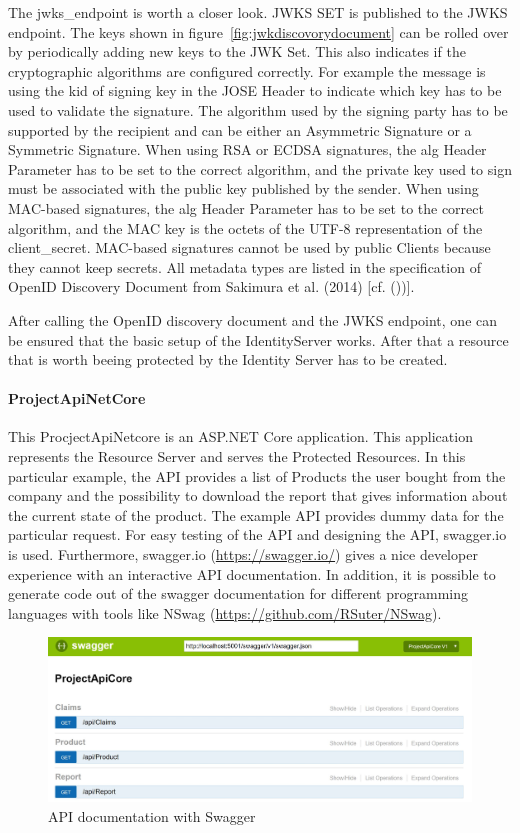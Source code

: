 The jwks\_endpoint is worth a closer look. JWKS SET is published to the JWKS endpoint. The keys shown in figure~\ref{fig:jwkdiscovorydocument} can be rolled over by periodically adding new keys to the JWK Set. This also indicates if the cryptographic algorithms are configured correctly. For example the message is using the kid of signing key in the JOSE Header to indicate which key has to be used to validate the signature. The algorithm used by the signing party has to be supported by the recipient and can be either an Asymmetric Signature or a Symmetric Signature. 
When using RSA or ECDSA signatures, the alg Header Parameter has to be set to the correct algorithm, and the private key used to sign must be associated with the public key published by the sender. When using MAC-based signatures, the alg Header Parameter has to be set to the correct algorithm, and the MAC key is the octets of the UTF-8 representation of the client\_secret. MAC-based signatures cannot be used by public Clients because they cannot keep secrets.  All metadata types are listed in the specification of OpenID Discovery Document from Sakimura et al. (2014) [cf. (\cite{Sakimura:OIDCD}))]. 

After calling the OpenID discovery document and the JWKS endpoint, one can be ensured that the basic setup of the IdentityServer works. After that a resource that is worth beeing protected by the Identity Server has to be created. 

\paragraph{ProjectApiNetCore}

This ProcjectApiNetcore is an ASP.NET Core application. This application represents the Resource Server and serves the Protected Resources. In this particular example, the API provides a list of Products the user bought from the company and the possibility to download the report that gives information about the current state of the product. The example API provides dummy data for the particular request. For easy testing of the API and designing the API, swagger.io is used. Furthermore, swagger.io (\url{https://swagger.io/}) gives a nice developer experience with an interactive API documentation. In addition, it is possible to generate code out of the swagger documentation for different programming languages with tools like NSwag (\url{https://github.com/RSuter/NSwag}).

\begin{figure}[h]
	\centering
	\includegraphics[width=0.7\linewidth]{images/apis}
	\caption{API documentation with Swagger}
	\label{fig:apis}
\end{figure}


